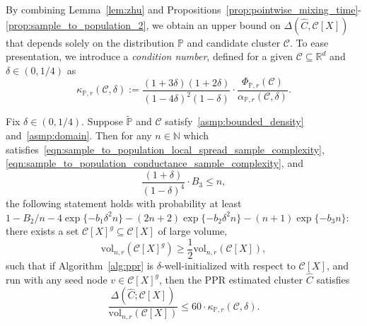 \documentclass[twoside,11pt]{article}
\newcommand{\Reals}{\mathbb{R}}
\newcommand{\1}{\mathbf{1}}
\newcommand{\Rd}{\Reals^d}
\newcommand{\mc}[1]{\mathcal{#1}}
\newcommand{\mbb}[1]{\mathbb{#1}}
\newcommand{\Pbb}{\mathbb{P}}
\newcommand{\wt}[1]{\widetilde{#1}}
\newcommand{\wh}[1]{\widehat{#1}}
\newcommand{\vol}{\mathrm{vol}}
\begin{document}
By combining Lemma~\ref{lem:zhu} and Propositions~\ref{prop:pointwise_mixing_time}-\ref{prop:sample_to_population_2}, we obtain an upper bound on $\Delta(\wh{C},\mc{C}[X])$ that depends solely on the distribution $\Pbb$ and candidate cluster $\mc{C}$. To ease presentation, we introduce a \emph{condition number}, defined for a given $\mc{C} \subseteq \Rd$ and $\delta \in (0,1/4)$ as
\begin{equation}
\label{eqn:condition_number}
\kappa_{\Pbb,r}(\mc{C},\delta) := \frac{(1 + 3\delta)(1+2\delta)}{(1 - 4\delta)^2(1 - \delta)} \cdot \frac{\Phi_{\Pbb,r}(\mc{C})}{\alpha_{\Pbb,r}(\mc{C},\delta)}.
\end{equation}

\begin{theorem}
	\label{thm:volume_ssd_ub} 
	Fix $\delta \in (0,1/4)$. Suppose $\wt{\Pbb}$ and $\mc{C}$ satisfy~\ref{asmp:bounded_density} and~\ref{asmp:domain}. Then for any $n \in \mbb{N}$ which satisfies~\eqref{eqn:sample_to_population_local_spread_sample_complexity}, \eqref{eqn:sample_to_population_conductance_sample_complexity}, and
	\begin{equation}
	\label{eqn:volume_ssd_ub_sample_complexity}
	\frac{(1 + \delta)}{(1 - \delta)^4} \cdot B_3 \leq n,
	\end{equation} 
	the following statement holds with probability at least $1 - B_2/n - 4\exp\{-b_1\delta^2n\} - (2n + 2)\exp\{-b_2\delta^2n\} - (n + 1)\exp\{-b_3n\}$: there exists a set $\mc{C}[X]^g \subseteq \mc{C}[X]$ of large volume,
	$$
	\vol_{n,r}(\mc{C}[X]^g) \geq \frac{1}{2}\vol_{n,r}(\mc{C}[X]),
	$$ 
	such that if Algorithm~\ref{alg:ppr} is $\delta$-well-initialized with respect to $\mc{C}[X]$, and run with any seed node $v \in \mc{C}[X]^g$, then the PPR estimated cluster $\wh{C}$ satisfies
	\begin{equation}
	\label{eqn:volume_ssd_ub}
	\frac{\Delta(\wh{C};\mc{C}[X])}{\vol_{n,r}(\mc{C}[X])} \leq 60 \cdot \kappa_{\Pbb,r}(\mc{C},\delta).
	\end{equation}
\end{theorem}
\end{document}
